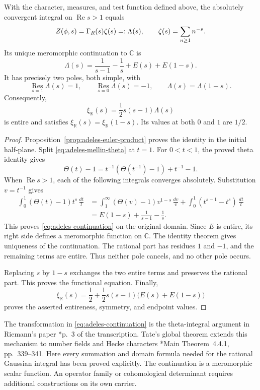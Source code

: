 \begin{theorem}
\label{thm:adeles-tate}
\label{thm:tate}
With the character, measures, and test function defined above, the
absolutely convergent integral on \(\operatorname{Re}s>1\) equals
\[
 Z(\phi,s)=\Gamma_{R}(s)\zeta(s)=:\Lambda(s),\qquad
 \zeta(s)=\sum_{n\geq1}n^{-s}.
\]
Its unique meromorphic continuation to \(\mathbb C\) is
\begin{equation}
 \Lambda(s)=\frac1{s-1}-\frac1s+E(s)+E(1-s).
 \label{eq:adeles-continuation}
\end{equation}
It has precisely two poles, both simple, with
\[
 \operatorname*{Res}_{s=1}\Lambda(s)=1,\qquad
 \operatorname*{Res}_{s=0}\Lambda(s)=-1,
 \qquad \Lambda(s)=\Lambda(1-s).
\]
Consequently,
\[
 \xi_{\mathbb R}(s)=\frac12s(s-1)\Lambda(s)
\]
is entire and satisfies \(\xi_{\mathbb R}(s)=\xi_{\mathbb R}(1-s)\).
Its values at both \(0\) and \(1\) are \(1/2\).
\end{theorem}

\begin{proof}
Proposition~\ref{prop:adeles-euler-product} proves the identity in the
initial half-plane. Split \eqref{eq:adeles-mellin-theta} at \(t=1\).
For \(0<t<1\), the proved theta identity gives
\[
 \Theta(t)-1=t^{-1}(\Theta(t^{-1})-1)+t^{-1}-1.
\]
When \(\operatorname{Re}s>1\), each of the following integrals converges
absolutely. Substitution \(v=t^{-1}\) gives
\begin{align*}
 \int_0^1(\Theta(t)-1)t^s\,\frac{dt}{t}
 &=\int_1^\infty(\Theta(v)-1)v^{1-s}\,\frac{dv}{v}
   +\int_0^1(t^{s-1}-t^s)\,\frac{dt}{t}\\
 &=E(1-s)+\frac1{s-1}-\frac1s.
\end{align*}
This proves \eqref{eq:adeles-continuation} on the original domain.
Since \(E\) is entire, its right side defines a meromorphic function on
\(\mathbb C\). The identity theorem gives uniqueness of the continuation.
The rational part has residues \(1\) and \(-1\), and the remaining terms
are entire. Thus neither pole cancels, and no other pole occurs.

Replacing \(s\) by \(1-s\) exchanges the two entire terms and preserves
the rational part. This proves the functional equation. Finally,
\[
 \xi_{\mathbb R}(s)
 =\frac12+\frac12s(s-1)\bigl(E(s)+E(1-s)\bigr)
\]
proves the asserted entireness, symmetry, and endpoint values.
\end{proof}

The transformation in \eqref{eq:adeles-continuation} is the theta-integral
argument in Riemann's paper \cite{Riemann1859}*{p.~3 of the transcription}.
Tate's global theorem extends this mechanism to number fields and Hecke
characters \cite{Tate1950}*{Main Theorem~4.4.1, pp.~339--341}.
Here every summation and domain formula
needed for the rational Gaussian integral has been proved explicitly.
The continuation is a meromorphic scalar function. An operator family or
cohomological determinant requires additional constructions on its own
carrier.
